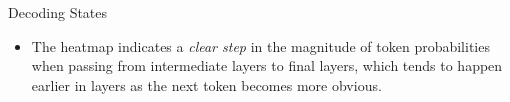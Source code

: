 \documentclass[aspectratio=169, 12pt, compress]{beamer}
\newcommand{\overimage}[2][0cm]{\vspace{#1}\vfill\smash{\begin{minipage}[c][][c]{\linewidth}\centerline{#2}\end{minipage}}\vfill} %
\begin{document}
    \begin{frame}{Decoding States}
        \begin{minipage}{0.6\textwidth}
            \centering
        \end{minipage}%
        \begin{minipage}{0.4\textwidth}
            \footnotesize
            \begin{itemize}[<+|visible@+->]
                \setlength\itemsep{0.2cm}
                \item<1-1> The heatmap indicates a \emph{clear step} in the magnitude of token probabilities when passing from intermediate layers to final layers, which tends to happen earlier in layers as the next token becomes more obvious.
            \end{itemize}
        \end{minipage}
    \end{frame}
\end{document}
